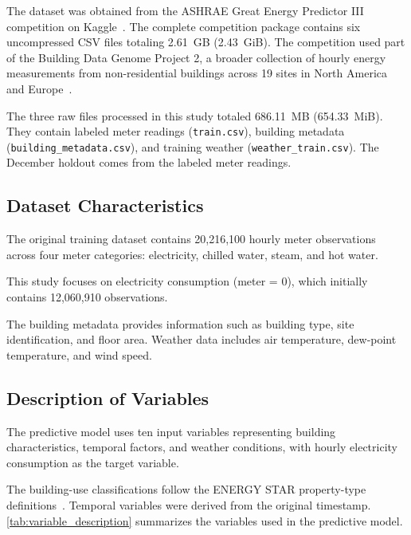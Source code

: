 \documentclass[12pt]{article}
\begin{document}
The dataset was obtained from the ASHRAE Great Energy Predictor III competition on Kaggle~\parencite{ashrae}. The complete competition package contains six uncompressed CSV files totaling 2.61~GB (2.43~GiB). The competition used part of the Building Data Genome Project 2, a broader collection of hourly energy measurements from non-residential buildings across 19 sites in North America and Europe~\parencite{miller2020building}.

The three raw files processed in this study totaled 686.11~MB (654.33~MiB). They contain labeled meter readings (\nolinkurl{train.csv}), building metadata (\nolinkurl{building_metadata.csv}), and training weather (\nolinkurl{weather_train.csv}). The December holdout comes from the labeled meter readings.

\subsection{Dataset Characteristics}

The original training dataset contains 20,216,100 hourly meter observations across four meter categories: electricity, chilled water, steam, and hot water.

This study focuses on electricity consumption (meter = 0), which initially contains 12,060,910 observations.

The building metadata provides information such as building type, site identification, and floor area. Weather data includes air temperature, dew-point temperature, and wind speed.

\subsection{Description of Variables}

The predictive model uses ten input variables representing building characteristics, temporal factors, and weather conditions, with hourly electricity consumption as the target variable.

The building-use classifications follow the ENERGY STAR property-type definitions~\parencite{miller2020building}. Temporal variables were derived from the original timestamp. \autoref{tab:variable_description} summarizes the variables used in the predictive model.
\end{document}
